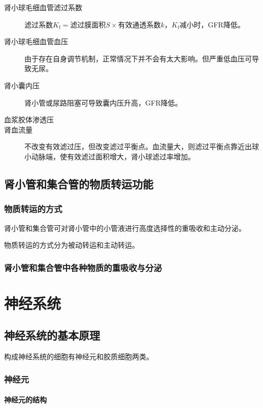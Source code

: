 \begin{description}
	\item[肾小球毛细血管滤过系数] $\text{滤过系数}K_{\text{f}}=\text{滤过膜面积}S\times\text{有效通透系数}k$，$K_{\text{f}}$减小时，GFR降低。
	\item[肾小球毛细血管血压] 由于存在自身调节机制，正常情况下并不会有太大影响。但严重低血压可导致无尿。
	\item[肾小囊内压] 肾小管或尿路阻塞可导致囊内压升高，GFR降低。
	\item[血浆胶体渗透压]
	\item[肾血流量] 不改变有效滤过压，但改变滤过平衡点。血流量大，则滤过平衡点靠近出球小动脉端，使有效滤过面积增大，肾小球滤过率增加。
\end{description}

\subsection{肾小管和集合管的物质转运功能}

\subsubsection{物质转运的方式}

肾小管和集合管可对肾小管中的小管液进行高度选择性的重吸收和主动分泌。

物质转运的方式分为被动转运和主动转运。

\subsubsection{肾小管和集合管中各种物质的重吸收与分泌}



\section{神经系统}

\subsection{神经系统的基本原理}

构成神经系统的细胞有神经元和胶质细胞两类。

\subsubsection{神经元}

\paragraph{神经元的结构}

